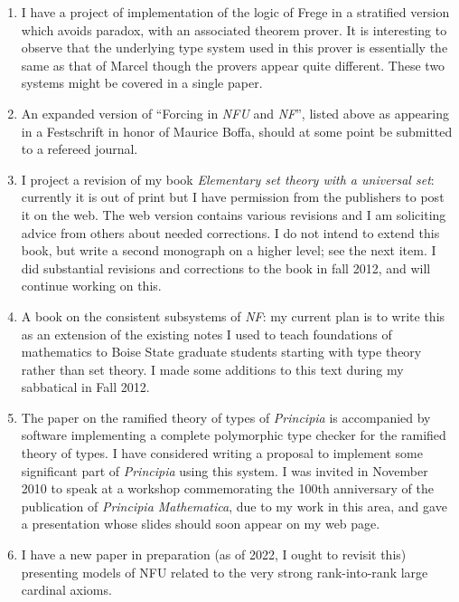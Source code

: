 \begin{description}
\begin{enumerate}
\item I have a project of implementation of the logic of Frege in a stratified version which avoids paradox,
with an associated theorem prover.  It is interesting to observe that the underlying type system used in this prover is essentially the same as that of Marcel though the provers appear quite different.  These two systems might be covered in a single paper.

\item An expanded version of ``Forcing in {\em NFU\/} and {\em
NF\/}'', listed above as appearing in a Festschrift in honor of
Maurice Boffa, should at some point be submitted to a refereed
journal.

\item I project a revision of my book {\em Elementary set theory with
a universal set\/}: currently it is out of print but I have permission
from the publishers to post it on the web.  The web version contains
various revisions and I am soliciting advice from others about needed
corrections.  I do not intend to extend this book, but write a second
monograph on a higher level; see the next item.  I did substantial revisions and corrections to the book in fall 2012, and will continue working on this.

\item A book on the consistent subsystems of {\em NF\/}: my current
plan is to write this as an extension of the existing notes I used to
teach foundations of mathematics to Boise State graduate students
starting with type theory rather than set theory.  I made some additions to this text during my sabbatical in Fall 2012.

\item The paper on the ramified theory of types of {\em Principia\/}
is accompanied by software implementing a complete polymorphic type
checker for the ramified theory of types.  I have considered writing a
proposal to implement some significant part of {\em Principia\/} using
this system.  I was invited in November 2010 to speak at a workshop
commemorating the 100th anniversary of the publication of {\em
Principia Mathematica\/}, due to my work in this area, and gave a
presentation whose slides should soon appear on my web page.

\item I have a new paper in preparation (as of 2022, I ought to revisit this) presenting models of NFU related to the very strong rank-into-rank large cardinal axioms.

\end{enumerate}

\end{description}





















